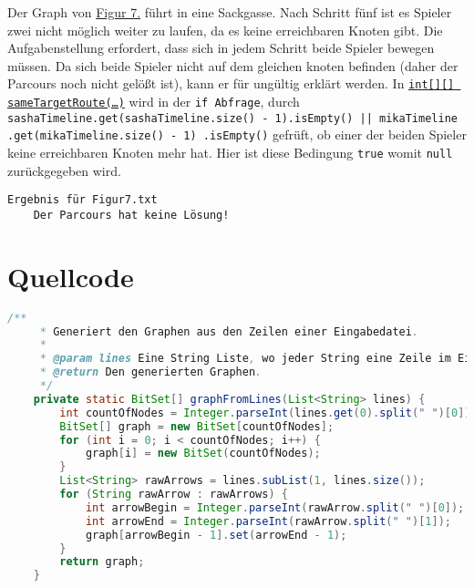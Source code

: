\documentclass[a4paper,10pt,ngerman]{scrartcl}
\begin{document}
	Der Graph von \hyperref[fig:Figure7]{Figur 7.} führt in eine Sackgasse.
	Nach Schritt fünf ist es Spieler zwei nicht möglich weiter zu laufen, da es keine erreichbaren Knoten gibt.
	Die Aufgabenstellung erfordert, dass sich in jedem Schritt beide Spieler bewegen müssen.
	Da sich beide Spieler nicht auf dem gleichen knoten befinden (daher der Parcours noch nicht gelößt ist),
	kann er für ungültig erklärt werden.
	In \hyperref[lst:sameTargetRoute]{\texttt{int[][] sameTargetRoute(\ldots)}} wird in der \texttt{if Abfrage}, durch 
	\texttt{sashaTimeline.get(sashaTimeline.size() - 1).isEmpty() || mikaTimeline
    .get(mikaTimeline.size() - 1)
    .isEmpty()} gefrüft, ob einer der beiden Spieler keine erreichbaren Knoten mehr hat.
    Hier ist diese Bedingung \texttt{true} womit \texttt{null} zurückgegeben wird.
    
     \begin{lstlisting}[frame=single, title=Programmausgabe Figur 7., breaklines=true]
  Ergebnis für Figur7.txt
	Der Parcours hat keine Lösung!
    \end{lstlisting}
    
    \clearpage

    \section{Quellcode}
    \label{sec:quellcode}
    \label{LastPage}
    \begin{lstlisting}[frame=single,language=Java,title=Methode graphFromLines,breaklines=true]
    /**
     * Generiert den Graphen aus den Zeilen einer Eingabedatei.
     *
     * @param lines Eine String Liste, wo jeder String eine Zeile im Eingabeformat ist.
     * @return Den generierten Graphen.
     */
    private static BitSet[] graphFromLines(List<String> lines) {
        int countOfNodes = Integer.parseInt(lines.get(0).split(" ")[0]);
        BitSet[] graph = new BitSet[countOfNodes];
        for (int i = 0; i < countOfNodes; i++) {
            graph[i] = new BitSet(countOfNodes);
        }
        List<String> rawArrows = lines.subList(1, lines.size());
        for (String rawArrow : rawArrows) {
            int arrowBegin = Integer.parseInt(rawArrow.split(" ")[0]);
            int arrowEnd = Integer.parseInt(rawArrow.split(" ")[1]);
            graph[arrowBegin - 1].set(arrowEnd - 1);
        }
        return graph;
    }
    \end{lstlisting}
\end{document}
